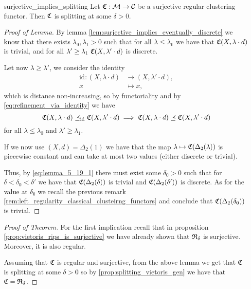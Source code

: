 \begin{lemma}{}{surjective_implies_splitting}
    Let $\mathfrak{C}: \mathcal{M} \to \mathcal{C}$ be a surjective regular clustering functor. Then $\mathfrak{C}$ is splitting at some $\delta > 0$.


\end{lemma}

\begin{proof}[Proof of Lemma]
    By lemma \ref{lem:surjective_implies_eventually_discrete} we know that there exists $\lambda_0, \lambda_1 > 0$ such that for all $\lambda \le \lambda_0$ we have that $\mathfrak{C}(X, \lambda \cdot d)$ is trivial, and for all $\lambda' \ge \lambda_1 \ \mathfrak{C}(X, \lambda' \cdot d)$ is discrete.

    Let now $\lambda \ge \lambda'$, we consider the identity
    \begin{align*}
        \mathrm{id}: (X, \lambda \cdot d) &\longrightarrow (X, \lambda' \cdot d),\\
        x &\longmapsto x,
    \end{align*}
    which is distance non-increasing, so by functoriality and by \eqref{eq:refinement_via_identity} we have
    \begin{equation}
    \label{eq:lemma_5_19_1}
    \mathfrak{C}(X, \lambda \cdot d) \preceq_\mathrm{id} \mathfrak{C}(X, \lambda' \cdot d) \implies \mathfrak{C}(X, \lambda \cdot d) \preceq \mathfrak{C}(X, \lambda' \cdot d)
    \end{equation}
    for all $\lambda \le \lambda_0$ and $\lambda' \ge \lambda_1$. 

    If we now use $(X,d) = \Delta_2(1)$ we have that the map $\lambda \mapsto \mathfrak{C}(\Delta_2(\lambda))$ is piecewise constant and can take at most two values (either discrete or trivial).

    Thus, by \eqref{eq:lemma_5_19_1} there must exist some $\delta_0 > 0$ such that for $\delta < \delta_0 < \delta'$ we have that $\mathfrak{C}(\Delta_2(\delta))$ is trivial and $\mathfrak{C}(\Delta_2(\delta'))$ is discrete.
    As for the value at $\delta_0$ we recall the previous remark \ref{rem:left_regularity_classical_clusteirng_functors} and conclude that $\mathfrak{C}(\Delta_2(\delta_0))$ is trivial.
\end{proof}

\begin{proof}[Proof of Theorem]
    For the first implication recall that in proposition \ref{prop:vietoris_rips_is_surjective} we have already shown that $\mathfrak{R}_\delta$ is surjective. Moreover, it is also regular.

    Assuming that $\mathfrak{C}$ is regular and surjective, from the above lemma we get that $\mathfrak{C}$ is splitting at some $\delta > 0$ so by \ref{prop:splitting_vietoris_gen} we have that $\mathfrak{C} = \mathfrak{R}_{\delta}$.
\end{proof}

